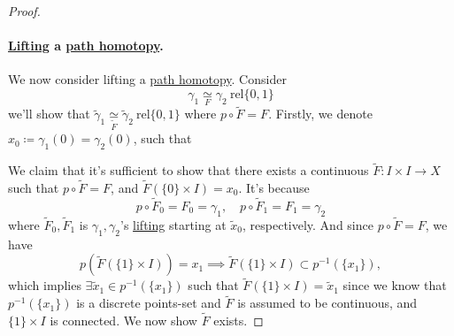 \begin{proof}
	\paragraph{\hyperref[def:lift]{Lifting} a \hyperref[def:homotopy-path]{path homotopy}.} We now consider lifting a \hyperref[def:homotopy-path]{path homotopy}. Consider
	\[
		\gamma _1\underset{F}{\simeq } \gamma _2 \ \mathrm{rel} \{0, 1\}
	\]
	we'll show that \(\widetilde{\gamma}_1\underset{\widetilde{F} }{\simeq} \widetilde{\gamma}_2 \ \mathrm{rel} \{0, 1\}\) where \(p\circ \widetilde{F} = F\). Firstly,
	we denote \(x_0\coloneqq\gamma _1(0) = \gamma _2(0)\), such that
	\begin{figure}[H]
		\centering
		\label{fig:pf:col:lec14-4}
	\end{figure}
	We claim that it's sufficient to show that there exists a continuous \(\widetilde{F} \colon I\times I\to X\) such that \(p\circ \widetilde{F} = F\), and \(\widetilde{F} (\{0\}\times I)= x_0\).
	It's because
	\[
		p\circ \widetilde{F} _0 = F_0 = \gamma _1,\quad p\circ \widetilde{F} _1= F_1= \gamma _2
	\]
	where \(\widetilde{F} _0, \widetilde{F} _1\) is \(\gamma _1, \gamma _2\)'s \hyperref[prop:homotopy-lifting-property]{lifting} starting at \(\widetilde{x} _0\), respectively. And since
	\(p\circ\widetilde{F} = F\), we have
	\[
		p\left(\widetilde{F} (\{1\}\times I)\right) = x_1 \implies \widetilde{F} (\{1\}\times I)\subset p^{-1} (\{x_1\}),
	\]
	which implies \(\exists \widetilde{x} _1 \in p^{-1} (\{x_1\})\) such that \(\widetilde{F} (\{1\}\times I) = \widetilde{x} _1\) since we know that \(p^{-1} (\{x_1\})\) is a discrete
	points-set and \(\widetilde{F} \) is assumed to be continuous, and \(\{1\}\times I\) is connected. We now show \(\widetilde{F} \) exists.


\end{proof}
